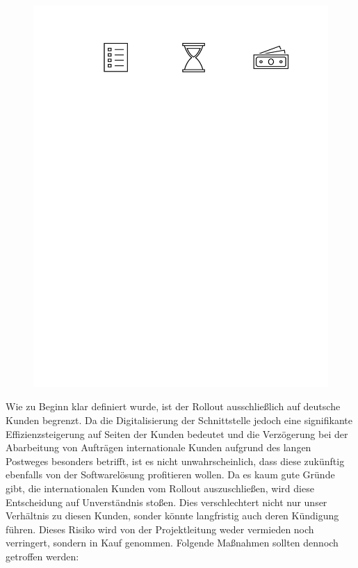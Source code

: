 \begin{figure}
	\includegraphics[width=\linewidth]{img/Risikotyp_Kosten}
\end{figure}

Wie zu Beginn klar definiert wurde, ist der Rollout ausschließlich auf deutsche Kunden begrenzt. Da die Digitalisierung der Schnittstelle jedoch eine signifikante Effizienzsteigerung auf Seiten der Kunden bedeutet und die Verzögerung bei der Abarbeitung von Aufträgen internationale Kunden aufgrund des langen Postweges besonders betrifft, ist es nicht unwahrscheinlich, dass diese zukünftig ebenfalls von der Softwarelösung profitieren wollen. Da es kaum gute Gründe gibt, die internationalen Kunden vom Rollout auszuschließen, wird diese Entscheidung auf Unverständnis stoßen. Dies verschlechtert nicht nur unser Verhältnis zu diesen Kunden, sonder könnte langfristig auch deren Kündigung führen. Dieses Risiko wird von der Projektleitung weder vermieden noch verringert, sondern in Kauf genommen. Folgende Maßnahmen sollten dennoch getroffen werden:

